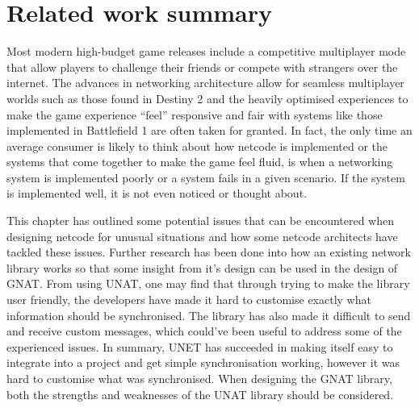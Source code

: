 \section{Related work summary} \label{sec:related_work_sum}
Most modern high-budget game releases include a competitive multiplayer mode that allow players to challenge their friends or compete with strangers over the internet. The advances in networking architecture allow for seamless multiplayer worlds such as those found in Destiny 2 and the heavily optimised experiences to make the game experience ``feel'' responsive and fair with systems like those implemented in Battlefield 1 are often taken for granted. In fact, the only time an average consumer is likely to think about how netcode is implemented or the systems that come together to make the game feel fluid, is when a networking system is implemented poorly or a system fails in a given scenario. If the system is implemented well, it is not even noticed or thought about.

This chapter has outlined some potential issues that can be encountered when designing netcode for unusual situations and how some netcode architects have tackled these issues. Further research has been done into how an existing network library works so that some insight from it's design can be used in the design of GNAT.
From using UNAT, one may find that through trying to make the library user friendly, the developers have made it hard to customise exactly what information should be synchronised. The library has also made it difficult to send and receive custom messages, which could've been useful to address some of the experienced issues. In summary, UNET has succeeded in making itself easy to integrate into a project and get simple synchronisation working, however it was hard to customise what was synchronised. When designing the GNAT library, both the strengths and weaknesses of the UNAT library should be considered.
